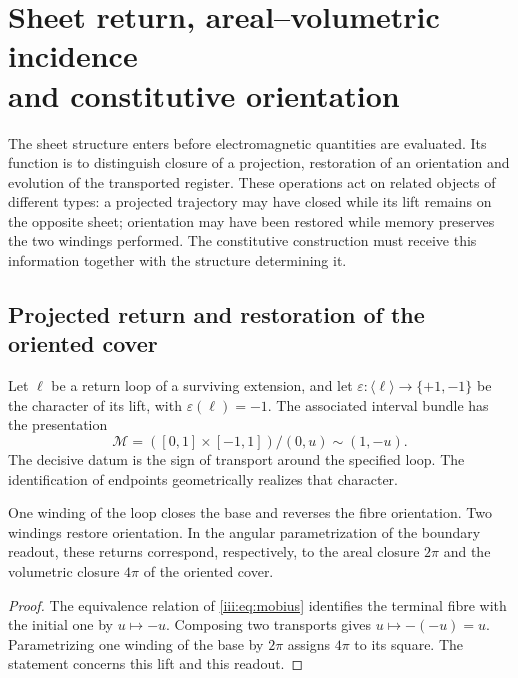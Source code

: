 \section[Sheet return, areal--volumetric incidence and constitutive orientation]{Sheet return, areal--volumetric incidence\\and constitutive orientation}
\label{iii:sec:hojas}

The sheet structure enters before electromagnetic quantities
are evaluated. Its function is to distinguish closure of a projection,
restoration of an orientation and evolution of the transported register.
These operations act on related objects of different types: a
projected trajectory may have closed while its lift remains
on the opposite sheet; orientation may have been restored while memory
preserves the two windings performed. The constitutive construction must receive
this information together with the structure determining it.

\subsection{Projected return and restoration of the oriented cover}

Let $\ell$ be a return loop of a surviving extension, and let
$\varepsilon:\langle\ell\rangle\to\{+1,-1\}$ be the character of its
lift, with $\varepsilon(\ell)=-1$. The associated interval bundle
has the presentation
\begin{equation}
 \mathcal M=([0,1]\times[-1,1])/{(0,u)\sim(1,-u)}.
 \label{iii:eq:mobius}
\end{equation}
The decisive datum is the sign of transport around the specified loop. The
identification of endpoints geometrically realizes that character.

\begin{proposition}
One winding of the loop closes the base and reverses the fibre orientation. Two
windings restore orientation. In the angular parametrization of the boundary
readout, these returns correspond, respectively, to the areal closure $2\pi$ and
the volumetric closure $4\pi$ of the oriented cover.
\end{proposition}
\begin{proof}
The equivalence relation of \eqref{iii:eq:mobius} identifies the terminal fibre
with the initial one by $u\mapsto-u$. Composing two transports gives
$u\mapsto-(-u)=u$. Parametrizing one winding of the base by $2\pi$ assigns $4\pi$
to its square. The statement concerns this lift and this readout.
\end{proof}

